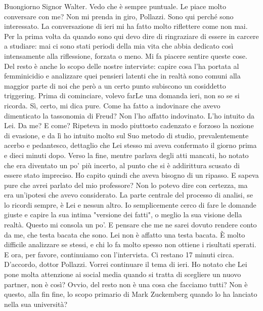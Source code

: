 \documentclass[a4paper,12pt]{article}
\newcommand{\Walter}{\speak{W}}
\newcommand{\Pollazzi}{\speak{P}}
\begin{document}
\pagebreak
\begin{dialogue}
 \Pollazzi  Buongiorno Signor Walter. Vedo che è sempre puntuale. Le piace molto conversare con me?
\Walter  Non mi prenda in giro, Pollazzi. Sono qui perché sono interessato. La conversazione di ieri mi ha fatto molto riflettere come non mai. Per la prima volta da quando sono qui devo dire di ringraziare di essere in carcere a studiare: mai ci sono stati periodi della mia vita che abbia dedicato così intensamente alla riflessione, forzata o meno.
\Pollazzi  Mi fa piacere sentire queste cose. Del resto è anche lo scopo delle nostre interviste: capire cosa l'ha portata al femminicidio e analizzare quei pensieri latenti che in realtà sono comuni alla maggior parte di noi che però a un certo punto subiscono un cosiddetto triggering.
\Walter  Prima di cominciare, volevo farLe una domanda ieri, non so se si ricorda.
\Pollazzi  Sì, certo, mi dica pure.
\Walter  Come ha fatto a indovinare che avevo dimenticato la tassonomia di Freud?
\Pollazzi  Non l'ho affatto indovinato. L'ho intuito da Lei.
\Walter  Da me? E come?
\Pollazzi  Ripeteva in modo piuttosto cadenzato e forzoso la nozione di evasione, e da lì ho intuito molto sul Suo metodo di studio, prevalentemente acerbo e pedantesco, dettaglio che Lei stesso mi aveva confermato il giorno prima e dieci minuti dopo. Verso la fine, mentre parlava degli atti mancati, ho notato che era diventato un po' più incerto, al punto che si è addirittura scusato di essere stato impreciso. Ho capito quindi che aveva bisogno di un ripasso.
\Walter  E sapeva pure che avrei parlato del mio professore?
\Pollazzi  Non lo potevo dire con certezza, ma era un'ipotesi che avevo considerato. La parte centrale del processo di analisi, se lo ricordi sempre, è Lei e nessun altro. Io semplicemente cerco di fare le domande giuste e capire la sua intima "versione dei fatti", o meglio la sua visione della realtà.
\Walter  Questo mi consola un po'. E pensare che me ne sarei dovuto rendere conto da me, che testa bacata che sono.
\Pollazzi  Lei non è affatto una testa bacata. È molto difficile analizzare se stessi, e chi lo fa molto spesso non ottiene i risultati sperati. E ora, per favore, continuiamo con l'intervista. Ci restano 17 minuti circa.
\Walter  D'accordo, dottor Pollazzi.
\Pollazzi  Vorrei continuare il tema di ieri. Ho notato che Lei pone molta attenzione ai social media quando si tratta di scegliere un nuovo partner, non è così?
\Walter  Ovvio, del resto non è una cosa che facciamo tutti? Non è questo, alla fin fine, lo scopo primario di Mark Zuckemberg quando lo ha lanciato nella sua università?

\end{dialogue}
\end{document}
